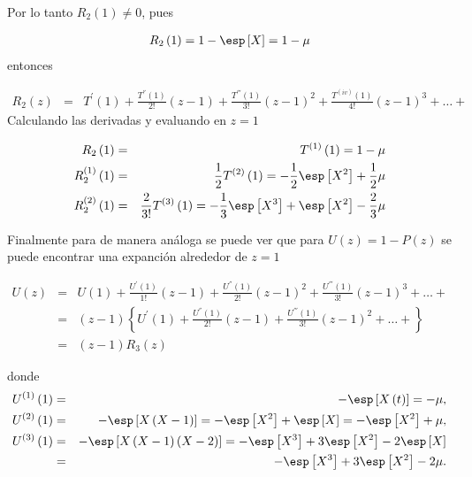 Por lo tanto $R_{2}\left(1\right)\neq0$, pues

\begin{eqnarray}\label{Eq.R2}
R_{2}\left(1\right)=1-\esp\left[X\right]=1-\mu
\end{eqnarray}
entonces

\begin{eqnarray}
R_{2}\left(z\right)&=&T^{'}\left(1\right)+\frac{T^{''}\left(1\right)}{2!}\left(z-1\right)+\frac{T^{'''}\left(1\right)}{3!}\left(z-1\right)^{2}+\frac{T^{(iv)}\left(1\right)}{4!}\left(z-1\right)^{3}+\ldots+
\end{eqnarray}
Calculando las derivadas y evaluando en $z=1$

\begin{eqnarray}
R_{2}\left(1\right)&=&T^{(1)}\left(1\right)=1-\mu\\
R_{2}^{(1)}\left(1\right)&=&\frac{1}{2}T^{(2)}\left(1\right)=-\frac{1}{2}\esp\left[X^{2}\right]+\frac{1}{2}\mu\\
R_{2}^{(2)}\left(1\right)&=&\frac{2}{3!}T^{(3)}\left(1\right)
=-\frac{1}{3}\esp\left[X^{3}\right]+\esp\left[X^{2}\right]-\frac{2}{3}\mu
\end{eqnarray}

Finalmente para de manera an\'aloga se puede ver que para $U\left(z\right)=1-P\left(z\right)$ se puede encontrar una expanci\'on alrededor de $z=1$

\begin{eqnarray*}
U\left(z\right)&=&U\left(1\right)+\frac{U^{'}\left(1\right)}{1!}\left(z-1\right)+\frac{U^{''}\left(1\right)}{2!}\left(z-1\right)^{2}+\frac{U^{'''}\left(1\right)}{3!}\left(z-1\right)^{3}+\ldots+\\
&=&\left(z-1\right)\left\{U^{'}\left(1\right)+\frac{U^{''}\left(1\right)}{2!}\left(z-1\right)+\frac{U^{'''}\left(1\right)}{3!}\left(z-1\right)^{2}+\ldots+\right\}\\
&=&\left(z-1\right)R_{3}\left(z\right)
\end{eqnarray*}

donde 
\begin{eqnarray*}
U^{(1)}\left(1\right)&=&-\esp\left[X\left(t\right)\right]=-\mu,\\ U^{(2)}\left(1\right)&=&-\esp\left[X\left(X-1\right)\right]
=-\esp\left[X^{2}\right]+\esp\left[X\right]=-\esp\left[X^{2}\right]+\mu,\\
U^{(3)}\left(1\right)&=&-\esp\left[X\left(X-1\right)\left(X-2\right)\right]
=-\esp\left[X^{3}\right]+3\esp\left[X^{2}\right]-2\esp\left[X\right]\\
&=&-\esp\left[X^{3}\right]+3\esp\left[X^{2}\right]-2\mu.
\end{eqnarray*}

